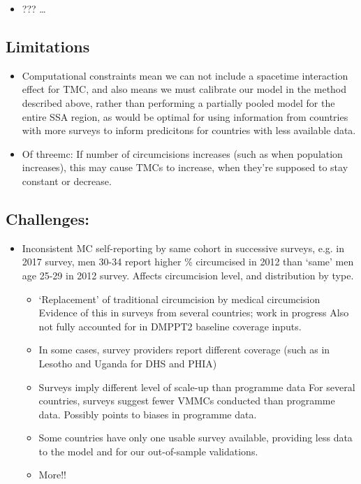 \documentclass{article}
\begin{document}
\begin{itemize}
\item ???
\ldots{}
\end{itemize}
\subsection*{Limitations}
\label{sec:org98b70b2}
\begin{itemize}
\item Computational constraints mean we can not include a spacetime interaction effect for TMC, and
also means we must calibrate our model in the method described above, rather than performing a
partially pooled model for the entire SSA region, as would be optimal for using information
from countries with more surveys to inform predicitons for countries with less available data.
\item Of threemc: If number of circumcisions increases (such as when population increases), this may
cause TMCs to increase, when they're supposed to stay constant or decrease.
\end{itemize}

\subsection*{Challenges:}
\label{sec:org217c727}
\begin{itemize}
\item Inconsistent MC self-reporting by same cohort in successive surveys, e.g. in 2017 survey, men
30-34 report higher \% circumcised in 2012 than ‘same’ men age 25-29 in 2012 survey.
Affects circumcision level, and distribution by type.
\begin{itemize}
\item ‘Replacement’ of traditional circumcision by medical circumcision
Evidence of this in surveys from several countries; work in progress
Also not fully accounted for in DMPPT2 baseline coverage inputs.
\item In some cases, survey providers report different coverage (such as in Lesotho and Uganda for DHS and PHIA)
\item Surveys imply different level of scale-up than programme data
For several countries, surveys suggest fewer VMMCs conducted than programme data.
Possibly points to biases in programme data.
\item Some countries have only one usable survey available, providing less data to the model and for
our out-of-sample validations.
\item More!!
\end{itemize}
\end{itemize}
\end{document}
